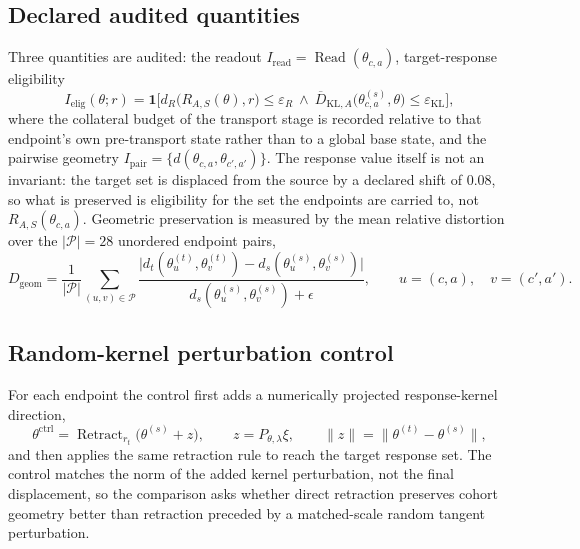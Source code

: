 \documentclass[11pt]{article}
\begin{document}
\subsection{Declared audited quantities}

Three quantities are audited: the readout $I_{\mathrm{read}}=\operatorname{Read}(\theta_{c,a})$,
target-response eligibility
\begin{equation}
I_{\mathrm{elig}}(\theta;r)=\mathbf{1}\bigl[d_R\bigl(R_{A,S}(\theta),r\bigr)\le\varepsilon_R\ \wedge\
\overline{D}_{\mathrm{KL},A}\bigl(\theta^{(s)}_{c,a},\theta\bigr)\le\varepsilon_{\mathrm{KL}}\bigr],
\end{equation}
where the collateral budget of the transport stage is recorded relative to that endpoint's own pre-transport
state rather than to a global base state, and the
pairwise geometry $I_{\mathrm{pair}}=\{d(\theta_{c,a},\theta_{c',a'})\}$. The response value itself is
not an invariant: the target set is displaced from the source by a declared shift of 0.08, so what is preserved
is eligibility for the set the endpoints are carried to, not $R_{A,S}(\theta_{c,a})$. Geometric preservation is measured by the mean relative
distortion over the $|\mathcal{P}|=28$ unordered endpoint pairs,
\begin{equation}
D_{\mathrm{geom}}=\frac{1}{|\mathcal{P}|}\sum_{(u,v)\in\mathcal{P}}
\frac{\bigl|d_t(\theta^{(t)}_u,\theta^{(t)}_v)-d_s(\theta^{(s)}_u,\theta^{(s)}_v)\bigr|}
{d_s(\theta^{(s)}_u,\theta^{(s)}_v)+\epsilon},
\qquad u=(c,a),\quad v=(c',a').
\end{equation}

\subsection{Random-kernel perturbation control}

For each endpoint the control first adds a numerically projected response-kernel direction,
\begin{equation}
\theta^{\mathrm{ctrl}}=\operatorname{Retract}_{r_t}\bigl(\theta^{(s)}+z\bigr),\qquad
z=P_{\theta,\lambda}\xi,\qquad
\lVert z\rVert=\bigl\lVert\theta^{(t)}-\theta^{(s)}\bigr\rVert,
\end{equation}
and then applies the same retraction rule to reach the target response set. The control matches the norm of the
added kernel perturbation, not the final displacement, so the comparison asks whether direct retraction
preserves cohort geometry better than retraction preceded by a matched-scale random tangent perturbation.
\end{document}
